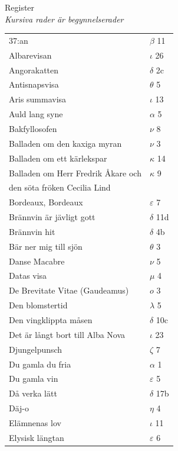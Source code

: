 \documentclass[a6paper,10pt]{article}
\begin{document}
\noindent\Large Register
\vspace{5pt}\\
\small\textit{Kursiva rader är begynnelserader}
\begin{table}[!h]
\begin{tabular}{l l}
37:an&$\beta$ 11\\
Albarevisan&$\iota$ 26\\
Angorakatten&$\delta$ 2c\\
Antisnapsvisa&$\theta$ 5\\
Aris summavisa&$\iota$ 13\\
Auld lang syne&$\alpha$ 5\\
Bakfyllosofen&$\nu$ 8\\
Balladen om den kaxiga myran&$\nu$ 3\\
Balladen om ett kärlekspar&$\kappa$ 14\\
Balladen om Herr Fredrik Åkare och&$\kappa$ 9 \\
den söta fröken Cecilia Lind&	\\
Bordeaux, Bordeaux&$\varepsilon$ 7\\
Brännvin är jävligt gott&$\delta$ 11d\\
Brännvin hit&$\delta$ 4b\\
Bär ner mig till sjön&$\theta$ 3\\
Danse Macabre&$\nu$ 5\\
Datas visa&$\mu$ 4\\
De Brevitate Vitae (Gaudeamus)&$o$ 3\\
Den blomstertid&$\lambda$ 5\\
Den vingklippta måsen&$\delta$ 10c\\
Det är långt bort till Alba Nova&$\iota$ 23\\
Djungelpunsch&$\zeta$ 7\\
Du gamla du fria&$\alpha$ 1\\
Du gamla vin&$\varepsilon$ 5\\
Då verka lätt&$\delta$ 17b\\
Däj-o&$\eta$ 4\\
Elämnenas lov&$\iota$ 11\\
Elysisk längtan&$\varepsilon$ 6\\
\end{tabular}
\end{table}
\end{document}
